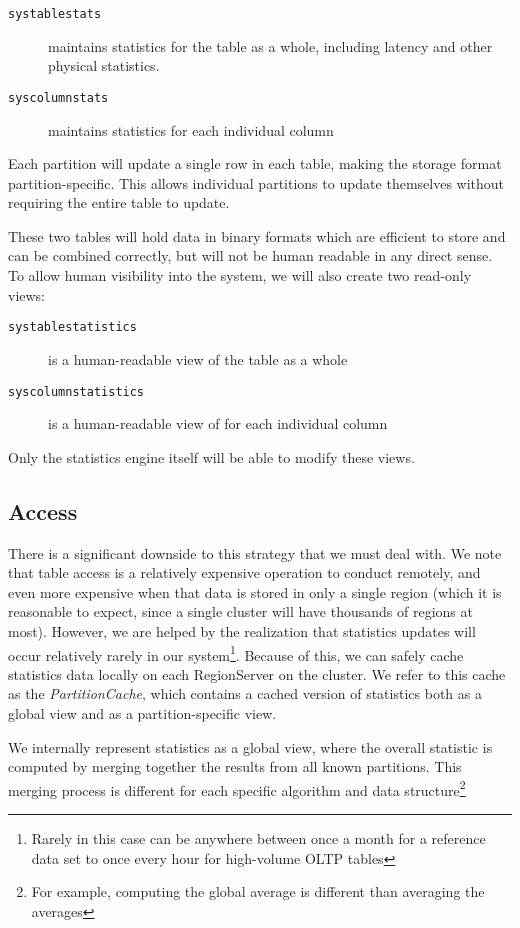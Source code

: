 \begin{description}
				\item[\texttt{systablestats}] maintains statistics for the table as a whole, including latency and other physical statistics.
				\item[\texttt{syscolumnstats}] maintains statistics for each individual column
\end{description}

Each partition will update a single row in each table, making the storage format partition-specific. This allows individual partitions to update themselves without requiring the entire table to update.

These two tables will hold data in binary formats which are efficient to store and can be combined correctly, but will not be human readable in any direct sense. To allow human visibility into the system, we will also create two read-only views:

\begin{description}
				\item[\texttt{systablestatistics}] is a human-readable view of the table as a whole
				\item[\texttt{syscolumnstatistics}] is a human-readable view of for each individual column
\end{description}
Only the statistics engine itself will be able to modify these views.

\subsection{Access}
There is a significant downside to this strategy that we must deal with. We note that table access is a relatively expensive operation to conduct remotely, and even more expensive when that data is stored in only a single region (which it is reasonable to expect, since a single cluster will have thousands of regions at most). However, we are helped by the realization that statistics updates will occur relatively rarely in our system\footnote{Rarely in this case can be anywhere between once a month for a reference data set to once every hour for high-volume OLTP tables}. Because of this, we can safely cache statistics data locally on each RegionServer on the cluster. We refer to this cache as the \emph{PartitionCache}, which contains a cached version of statistics both as a global view and as a partition-specific view. 

We internally represent statistics as a global view, where the overall statistic is computed by merging together the results from all known partitions. This merging process is different for each specific algorithm and data structure\footnote{For example, computing the global average is different than averaging the averages}
